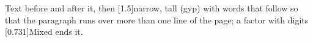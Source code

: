 \documentclass{article}
\begin{document}
Text before  and after it, then \scalebox{.5}[1.5]{narrow, tall (gyp)} with words that follow so that the paragraph runs over more than one line of the page; a factor with digits \scalebox{1.37}[0.731]{Mixed} ends it.
\end{document}
